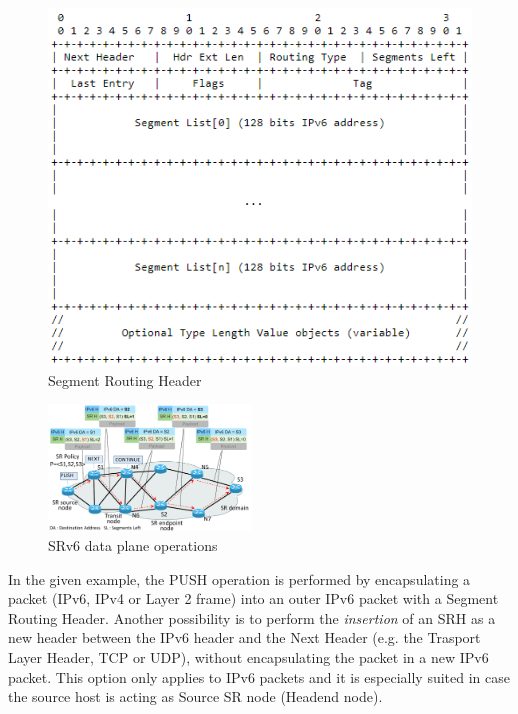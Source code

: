 \begin{figure}
    \centering
    \includegraphics[width=0.8\columnwidth]{fig/sr-header.png}
    \caption{Segment Routing Header}
    \label{fig:sr-header}
\end{figure}

\begin{figure}
    \centering
    \includegraphics[width=0.48\textwidth]{fig/srv6-example.pdf}
    \caption{SRv6 data plane operations}
    \label{fig:srv6-data plane}
    \vspace{-3ex}
\end{figure}

In the given example, the PUSH operation is performed by encapsulating a packet (IPv6, IPv4 or Layer 2 frame) into an outer IPv6 packet with a Segment Routing Header. Another possibility is to perform the \textit{insertion} of an SRH as a new header between the IPv6 header and the Next Header (e.g. the Trasport Layer Header, TCP or UDP), without encapsulating the packet in a new IPv6 packet. This option only applies to IPv6 packets and it is especially suited in case the source host is acting as Source SR node (Headend node). 

